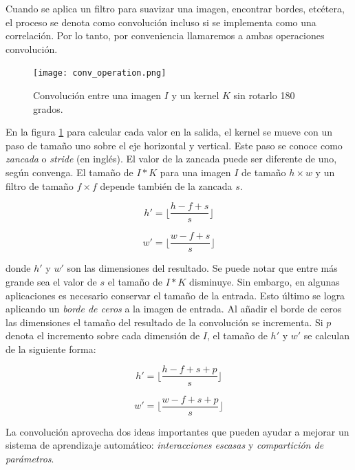 Cuando se aplica un filtro para suavizar una imagen, encontrar bordes, etcétera, el 
proceso se denota como convolución incluso si se implementa como una correlación. Por
lo tanto, por conveniencia llamaremos a ambas operaciones convolución.

\begin{figure}[h]
    \centering
    \texttt{[image: conv\_operation.png]}
    \caption{Convolución entre una imagen
    $I$ y un kernel $K$ sin rotarlo 180 grados.}
    \label{fig:convolution_example}
\end{figure}

En la figura \ref{fig:convolution_example} para calcular
cada valor en la salida, el kernel se mueve con un paso 
de tamaño uno sobre el eje horizontal y vertical. Este paso
se conoce como \textit{zancada} o \textit{stride} (en inglés).
El valor de la zancada puede ser diferente de uno, según 
convenga. El tamaño de $I * K$ para una imagen $I$ de tamaño
$h \times w$ y un filtro de tamaño $f \times f$ depende también de
la zancada $s$.

\[
h' = \lfloor\frac{h-f+s}{s}\rfloor
\]

\[
w' = \lfloor\frac{w-f+s}{s}\rfloor
\]

donde $h'$ y $w'$ son las dimensiones del resultado.
Se puede notar que entre más grande sea el valor de $s$
el tamaño de $I * K$ disminuye. Sin embargo, en algunas 
aplicaciones es necesario conservar el tamaño de la entrada.
Esto último se logra aplicando un \textit{borde de ceros}
a la imagen de entrada. Al añadir el borde de ceros las
dimensiones el tamaño del resultado de la convolución se 
incrementa. Si $p$ denota el incremento sobre cada dimensión
de $I$, el tamaño de $h'$ y $w'$ se calculan de la siguiente 
forma:


\[
h' = \lfloor\frac{h-f+s+p}{s}\rfloor
\]

\[
w' = \lfloor\frac{w-f+s+p}{s}\rfloor
\]


La convolución aprovecha dos ideas importantes que pueden ayudar a mejorar un
sistema de aprendizaje automático: \textit{interacciones escasas} y \textit{compartición de parámetros}.

